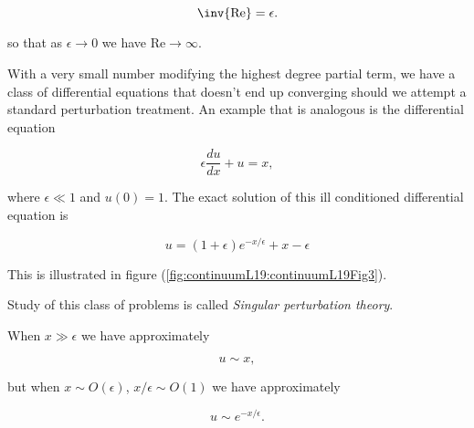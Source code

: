 \begin{equation}\label{eqn:continuumL19:630}
\inv{\text{Re}} = \epsilon.
\end{equation}

so that as $\epsilon \rightarrow 0$ we have $\text{Re} \rightarrow \infty$.

With a very small number modifying the highest degree partial term, we have a class of differential equations that doesn't end up converging should we attempt a standard perturbation treatment.  An example that is analogous is the differential equation

\begin{equation}\label{eqn:continuumL19:650}
\epsilon \frac{du}{dx} + u = x,
\end{equation}

where $\epsilon \ll 1$ and $u(0) = 1$.  The exact solution of this ill conditioned differential equation is

\begin{equation}\label{eqn:continuumL19:670}
u = (1 + \epsilon) e^{-x/\epsilon} + x - \epsilon
\end{equation}

This is illustrated in figure (\ref{fig:continuumL19:continuumL19Fig3}).


Study of this class of problems is called \textit{Singular perturbation theory}.

When $x \gg \epsilon$ we have approximately

\begin{equation}\label{eqn:continuumL19:690}
u \sim x,
\end{equation}

but when $x \sim O(\epsilon)$, $x/\epsilon \sim O(1)$ we have approximately

\begin{equation}\label{eqn:continuumL19:710}
u \sim e^{-x/\epsilon}.
\end{equation}

\EndArticle
